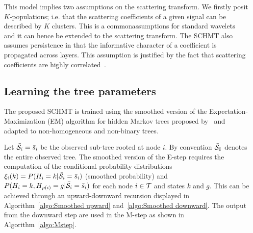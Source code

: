 \documentclass{article}
\begin{document}
    This model implies two assumptions on the scattering transform.  We firstly posit $K$-populations; i.e. that the scattering coefficients of a given signal can be described by $K$ clusters. This is a commonassumptions for standard wavelets~\cite{kingsbury2001complex} and it can hence be extended to the scattering transform. The SCHMT also assumes persistence in that the informative character of a
    coefficient is propagated across layers. This assumption is justified by the fact that scattering coefficients are highly correlated~\cite{oyallon2014deep}.
  
  \vspace{-5pt}
  \subsection{Learning the tree parameters}
    \label{subsec:SCHMT/Learning}    
    \vspace{-5pt}
    The proposed SCHMT is trained using the smoothed version of the Expectation-Maximization (EM) algorithm for hidden Markov trees proposed by~\cite{durand2001statistical} and adapted to non-homogeneous and non-binary trees.
    
    Let $\bar{\mathcal{S}}_{i}= \bar{s}_{i}$ be the observed sub-tree rooted at node $i$. By convention $\bar{\mathcal{S}}_{0}$ denotes the entire observed tree. The smoothed version of the E-step requires the computation of the conditional probability distributions $\xi_{i}(k) = P(H_{i}=k | \bar{\mathcal{S}}_{i}= \bar{s}_{i})$ (smoothed probability) and $P(H_{i}=k, H_{\rho(i)}=g | \bar{\mathcal{S}}_{i}= \bar{s}_{i})$ for each node $i \in \mathcal{T}$ and states $k$ and $g$. This can be achieved through an upward-downward recursion displayed in Algorithm~\ref{algo:Smoothed upward} and~\ref{algo:Smoothed downward}. The output from the downward step are used in the M-step as shown in Algorithm~\ref{algo:Mstep}.
    
\end{document}
